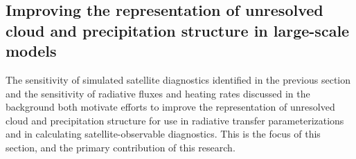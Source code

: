 \documentclass{article}
\begin{document}
\subsection{Improving the representation of unresolved cloud and precipitation structure in large-scale models}
The sensitivity of simulated satellite diagnostics identified in the previous section and the sensitivity of radiative fluxes and heating rates discussed in the background both motivate efforts to improve the representation of unresolved cloud and precipitation structure for use in radiative transfer parameterizations and in calculating satellite-observable diagnostics. This is the focus of this section, and the primary contribution of this research.
\end{document}
